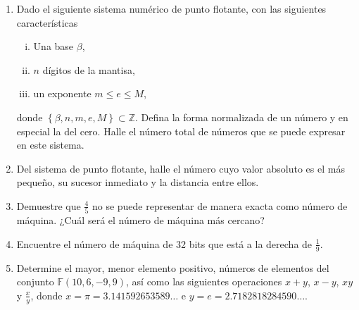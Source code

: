 \documentclass[
	spanish,
	8pt,
	utf8,
	xcolor=table,
	handout,
	aspectratio=169,
	professionalfonts,
	notheorems,
	mathserif,
]{beamer}
\newcounter{savedenum}
\newcommand*{\resume}{\setcounter{enumi}{\thesavedenum}}
\begin{document}
\begin{frame}
	\begin{enumerate}
		\resume
		\item

		      Dado el siguiente sistema numérico de punto flotante, con
		      las siguientes características

		      \begin{multicols}{3}

			      \begin{enumerate}[i)]
				      \item

				            Una base $\beta$,

				      \item

				            $n$ dígitos de la mantisa,

				      \item

				            un exponente $m\leq e\leq M$,
			      \end{enumerate}
		      \end{multicols}

		      donde $\left\{\beta,n,m,e,M\right\}\subset\mathbb{Z}$.
		      Defina la forma normalizada de un número y en especial la
		      del cero.
		      Halle el número total de números que se puede expresar en
		      este sistema.

		\item

		      Del sistema de punto flotante, halle el número cuyo valor
		      absoluto es el más pequeño, su sucesor inmediato y la
		      distancia entre ellos.


		\item

		      Demuestre que $\frac{4}{5}$ no se puede representar de
		      manera exacta como número de máquina.
		      ¿Cuál será el número de máquina más cercano?

		\item

		      Encuentre el número de máquina de 32 bits que está a la
		      derecha de $\frac{1}{9}$.

		\item

		      Determine el mayor, menor elemento positivo, números de
		      elementos del conjunto $\mathbb{F}\left(10,6,-9,9\right)$,
		      así como las siguientes operaciones $x+y$, $x-y$, $xy$ y
		      $\frac{x}{y}$, donde $x=\pi=3.141592653589\ldots$ e
		      $y=e=2.7182818284590\ldots$.


\end{enumerate}
\end{frame}
\end{document}
